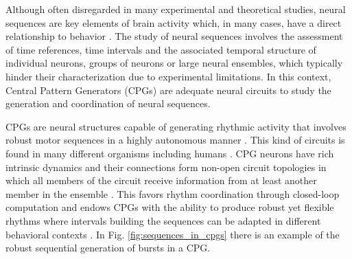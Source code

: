 Although often disregarded in many experimental and theoretical studies, neural sequences are key elements of brain activity which, in many cases, have a direct relationship to behavior \parencite{hahnloser_ultrasparse_2002,venaille_synchronization_2005,buzsaki_space_2018,rabinovich_discrete_2018,paton_neural_2018,elices_robust_2019}.
The study of neural sequences involves the assessment of time references, time intervals and the associated temporal structure of individual neurons, groups of neurons or large neural ensembles, which typically hinder their characterization due to experimental limitations. In this context, Central Pattern Generators (CPGs) are adequate neural circuits to study the generation and coordination of neural sequences. 

CPGs are neural structures capable of generating rhythmic activity that involves robust motor sequences in a highly autonomous manner \parencite{hartline_mottor_1976,selverston_reliable_2000,marder_central_2001}. This kind of circuits is found in many different organisms including humans \parencite{dimitrijevic_evidence_1998,pavlidis_neonatal_2016, arichi_localization_2017}. CPG neurons have rich intrinsic dynamics and their connections form non-open circuit topologies in which all members of the circuit receive information from at least another member in the ensemble \parencite{selverston_reliable_2000,huerta_topology_2001}. This favors rhythm coordination through closed-loop computation and endows CPGs with the ability to produce robust yet flexible rhythms where intervals building the sequences can be adapted in different behavioral contexts \parencite{elices_robust_2019}. %
In Fig. \ref{fig:sequences_in_cpgs} there is an example of the robust sequential generation of bursts in a CPG. 

